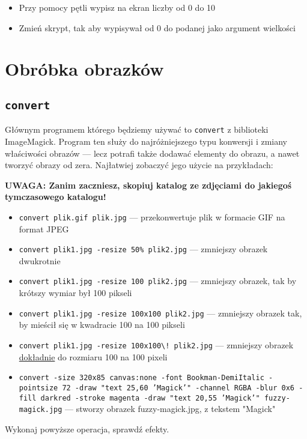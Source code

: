 \documentclass[polish]{instrukcja}
\begin{document}
\begin{itemize}
	\item Przy pomocy pętli wypisz na ekran liczby od 0 do 10
	\item Zmień skrypt, tak aby wypisywał od 0 do podanej jako argument wielkości
\end{itemize}


\section{Obróbka obrazków}
\subsection{{\tt convert}}
Głównym programem którego będziemy używać to {\tt convert} z biblioteki ImageMagick. Program ten służy do najróżniejszego typu konwersji i zmiany właściwości obrazów --- lecz potrafi także dodawać elementy do obrazu, a nawet tworzyć obrazy od zera. Najłatwiej zobaczyć jego użycie na przykładach:

{\bf UWAGA: Zanim zaczniesz, skopiuj katalog ze zdjęciami do jakiegoś tymczasowego katalogu!}

\begin{itemize}
\item {\tt convert plik.gif plik.jpg} --- przekonwertuje plik w formacie GIF na format JPEG
\item {\tt convert plik1.jpg -resize 50\% plik2.jpg} --- zmniejszy obrazek dwukrotnie
\item {\tt convert plik1.jpg -resize 100 plik2.jpg} --- zmniejszy obrazek, tak by krótszy wymiar był 100 pikseli
\item {\tt convert plik1.jpg -resize 100x100 plik2.jpg} --- zmniejszy obrazek tak, by mieścił się w kwadracie 100 na 100 pikseli
\item {\tt convert plik1.jpg -resize 100x100\textbackslash{}! plik2.jpg} --- zmniejszy obrazek \uline{dokładnie} do rozmiaru 100 na 100 pixeli
\item {\tt convert -size 320x85 canvas:none -font Bookman-DemiItalic -pointsize 72 -draw "text 25,60 'Magick'"{ }-channel RGBA -blur 0x6 -fill darkred -stroke magenta -draw "text 20,55 'Magick'"{ }fuzzy-magick.jpg} --- stworzy obrazek fuzzy-magick.jpg, z tekstem "Magick"
\end{itemize}
Wykonaj powyższe operacja, sprawdź efekty.
\end{document}
